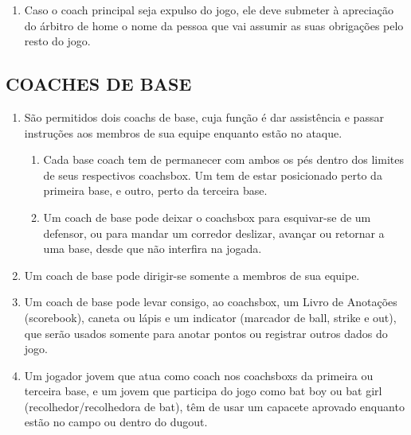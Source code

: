 \begin{multicols}{2}
\begin{enumerate}[label=\alph*)]
			\item  Caso o \gls{coach} principal seja expulso do jogo, ele deve submeter \`a aprecia\c{c}\~ao do 
			\'arbitro de \gls{home} o nome da pessoa que vai assumir as suas obriga\c{c}\~oes pelo resto do 
			jogo. 
		\end{enumerate}
		\subsection{COACHES DE BASE}
		
		\begin{enumerate}[label=\alph*)]
			\item S\~ao permitidos dois \glspl{coach} de base, cuja fun\c{c}\~ao \'e dar assist\^encia e passar instru\c{c}\~oes aos membros de sua equipe enquanto est\~ao no ataque. 
			
			\begin{enumerate}[label=\roman* -]
				\item Cada \gls{base coach} tem de permanecer com ambos os p\'es dentro dos limites de seus respectivos \gls{coachsbox}. Um tem de estar posicionado perto da primeira base, e outro, perto da terceira base. 
				
				\item Um \gls{coach} de base pode deixar o \gls{coachsbox} para esquivar-se de um defensor, ou para mandar um corredor deslizar, avan\c{c}ar ou retornar a uma base, desde que n\~ao interfira na jogada. 
			\end{enumerate}
			\item  Um \gls{coach} de base pode dirigir-se somente a membros de sua equipe. 
			
			\item  Um \gls{coach} de base pode levar consigo, ao \gls{coachsbox}, um Livro de Anota\c{c}\~oes (\gls{scorebook}), caneta ou l\'apis e um \gls{indicator} (marcador de \gls{ball}, \gls{strike} e \gls{out}), que ser\~ao usados somente para anotar pontos ou registrar outros dados do jogo. 
			
			\item  Um jogador jovem que atua como \gls{coach} nos \glspl{coachsbox} da primeira ou terceira base, e um jovem que participa do jogo como \gls{bat boy} ou \gls{bat girl} (recolhedor/recolhedora de \gls{bat}), t\^em de usar um capacete aprovado enquanto est\~ao no campo ou dentro do \Gls{dugout}. 
			
		\end{enumerate}
	\end{multicols}
